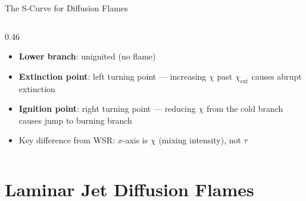 \documentclass[12pt,aspectratio=169]{beamer}
\newcommand{\chiext}{\chi_{\text{ext}}}
\newcommand{\taures}{\tau}
\begin{document}
\begin{frame}{The S-Curve for Diffusion Flames}
\begin{columns}
\begin{column}{0.46\textwidth}
\begin{itemize}
              decreases as $\chi_{\text{st}}$ increases (more strain
              $\to$ more heat loss $\to$ lower $T$)
        \item \textbf{Lower branch}: unignited (no flame)
        \item \textbf{Extinction point}: left turning point ---
              increasing $\chi$ past $\chiext$ causes abrupt
              extinction
        \item \textbf{Ignition point}: right turning point ---
              reducing $\chi$ from the cold branch causes jump
              to burning branch
        \item Key difference from WSR: $x$-axis is $\chi$ (mixing
              intensity), not $\taures$
      \end{itemize}
    \end{column}
  \end{columns}
\end{frame}

\section{Laminar Jet Diffusion Flames}
\end{document}
